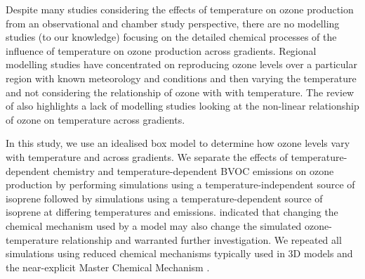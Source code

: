 Despite many studies considering the effects of temperature on ozone production from an observational and chamber study perspective, there are no modelling studies (to our knowledge) focusing on the detailed chemical processes of the influence of temperature on ozone production across  gradients.
Regional modelling studies have concentrated on reproducing ozone levels over a particular region with known meteorology and  conditions and then varying the temperature and not considering the relationship of ozone with  with temperature.
The review of \citet{Pusede:2015} also highlights a lack of modelling studies looking at the non-linear relationship of ozone on temperature across  gradients.

In this study, we use an idealised box model to determine how ozone levels vary with temperature and across  gradients.
We separate the effects of temperature-dependent chemistry and temperature-dependent BVOC emissions on ozone production by performing simulations using a temperature-independent source of isoprene followed by simulations using a temperature-dependent source of isoprene at differing temperatures and  emissions. 
\citet{Rasmussen:2013} indicated that changing the chemical mechanism used by a model may also change the simulated ozone-temperature relationship and warranted further investigation.
We repeated all simulations using reduced chemical mechanisms typically used in 3D models and the near-explicit Master Chemical Mechanism \citep{MCM_Site}.
